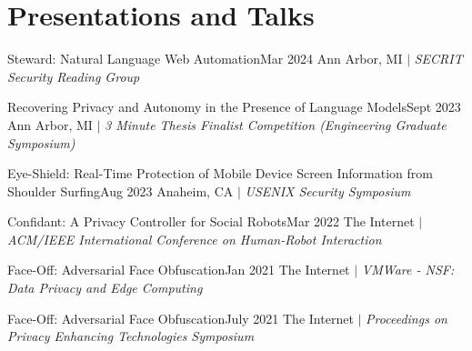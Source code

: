 \section{Presentations and Talks}
  \CVSubHeadingListStart
    \CVSubheading
      {{Steward: Natural Language Web Automation\cite{steward}}}{Mar 2024}
      {{Ann Arbor, MI} $|$ \emph{\small{SECRIT Security Reading Group}}}{}

    \CVSubheading
      {{Recovering Privacy and Autonomy in the Presence of Language Models}}{Sept 2023}
      {{Ann Arbor, MI} $|$ \emph{\small{3 Minute Thesis Finalist Competition (Engineering Graduate Symposium)}}}{}

    \CVSubheading
      {{Eye-Shield: Real-Time Protection of Mobile Device Screen Information from Shoulder Surfing}\cite{ShoulderSurfing}}{Aug 2023}
      {{Anaheim, CA} $|$ \emph{\small{USENIX Security Symposium}}}{}

    \CVSubheading
      {{Confidant: A Privacy Controller for Social Robots}\cite{HRIPrivacy}}{Mar 2022}
      {{The Internet} $|$ \emph{\small{ACM/IEEE International Conference on Human-Robot Interaction}}}{}

    \CVSubheading
      {{Face-Off: Adversarial Face Obfuscation}\cite{FaceOff}}{Jan 2021}
      {{The Internet} $|$ \emph{\small{VMWare - NSF: Data Privacy and Edge Computing}}}{}
      
    \CVSubheading
      {{Face-Off: Adversarial Face Obfuscation}\cite{FaceOff}}{July 2021}
      {{The Internet} $|$ \emph{\small{Proceedings on Privacy Enhancing Technologies Symposium}}}{}
  \CVSubHeadingListEnd
